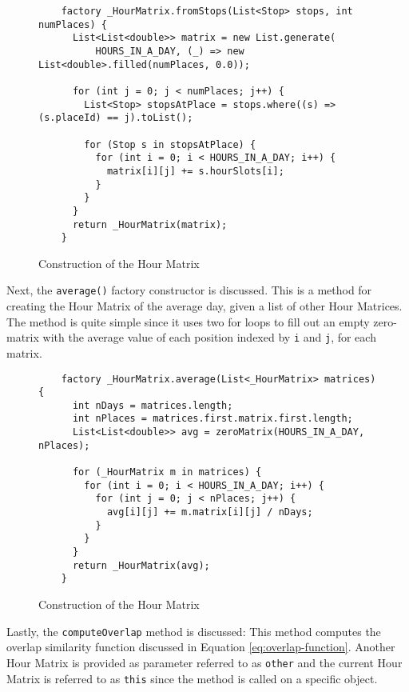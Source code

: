 \begin{figure}
    \centering
    \begin{verbatim}
    factory _HourMatrix.fromStops(List<Stop> stops, int numPlaces) {
      List<List<double>> matrix = new List.generate(
          HOURS_IN_A_DAY, (_) => new List<double>.filled(numPlaces, 0.0));
    
      for (int j = 0; j < numPlaces; j++) {
        List<Stop> stopsAtPlace = stops.where((s) => (s.placeId) == j).toList();
    
        for (Stop s in stopsAtPlace) {
          for (int i = 0; i < HOURS_IN_A_DAY; i++) {
            matrix[i][j] += s.hourSlots[i];
          }
        }
      }
      return _HourMatrix(matrix);
    }
    \end{verbatim}
    \caption{Construction of the Hour Matrix}
    \label{fig:hour-matrix-construction}
\end{figure}

Next, the \verb|average()| factory constructor is discussed. This is a method for creating the Hour Matrix of the average day, given a list of other Hour Matrices. The method is quite simple since it uses two for loops to fill out an empty zero-matrix with the average value of each position indexed by \verb|i| and \verb|j|, for each matrix.

\begin{figure}
    \centering
    \begin{verbatim}
    factory _HourMatrix.average(List<_HourMatrix> matrices) {
      int nDays = matrices.length;
      int nPlaces = matrices.first.matrix.first.length;
      List<List<double>> avg = zeroMatrix(HOURS_IN_A_DAY, nPlaces);
    
      for (_HourMatrix m in matrices) {
        for (int i = 0; i < HOURS_IN_A_DAY; i++) {
          for (int j = 0; j < nPlaces; j++) {
            avg[i][j] += m.matrix[i][j] / nDays;
          }
        }
      }
      return _HourMatrix(avg);
    }
    \end{verbatim}
    \caption{Construction of the Hour Matrix}
    \label{fig:hour-matrix-average}
\end{figure}

Lastly, the \verb|computeOverlap| method is discussed: This method computes the overlap similarity function discussed in Equation \eqref{eq:overlap-function}. Another Hour Matrix is provided as parameter referred to as \verb|other| and the current Hour Matrix is referred to as \verb|this| since the method is called on a specific object. 

